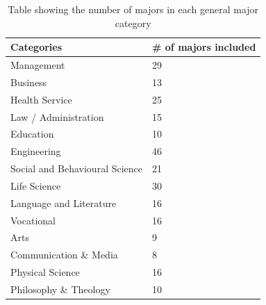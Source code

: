 \documentclass[conference]{IEEEtran}
\begin{document}
\begin{table}[]
\centering
\begin{tabular}{|l|l|}

\hline
{  Categories}                     & \# of majors included  \\ \hline
{  Management}                     & {  29}                                                                       \\ \hline
{  Business}                       & {  13}                                                                       \\ \hline
{  Health Service}                 & {  25}                                                                       \\ \hline
{  Law / Administration}           & {  15}                                                                       \\ \hline
{  Education}                      & {  10}                                                                       \\ \hline
{  Engineering}                    & {  46}                                                                       \\ \hline
{  Social and Behavioural Science} & {  21}                                                                       \\ \hline
{  Life Science}                   & {  30}                                                                       \\ \hline
{  Language and Literature}        & {  16}                                                                       \\ \hline
{  Vocational}                     & {  16}                                                                       \\ \hline
{  Arts}                           & {  9}                                                                        \\ \hline
{  Communication \& Media}         & {  8}                                                                        \\ \hline
{  Physical Science}               & {  16}                                                                       \\ \hline
{  Philosophy \& Theology}         & {  10}                                                                                        \\ \hline
\end{tabular}
\vspace{4pt}
\caption{Table showing the number of majors in each general major category}
\label{table:majorcat}
\end{table}
\end{document}
